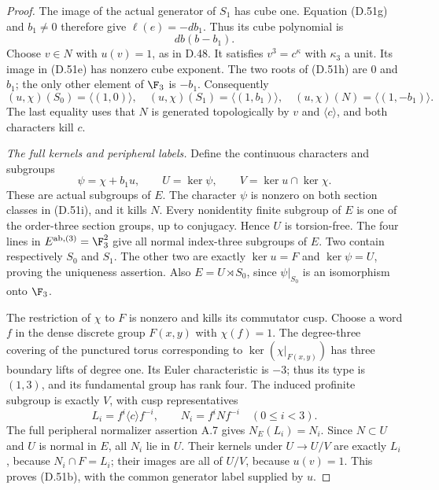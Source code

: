\begin{proof}
The image of the actual generator of $S_1$
has cube one. Equation (D.51g) and $b_1\ne0$
therefore give $\ell(e)=-db_1$.
Thus its cube polynomial is
\[
                           db(b-b_1).
                                                        \tag{D.51h}
\]
Choose $v\in N$ with $u(v)=1$, as in D.48.
It satisfies $v^3=c^\kappa$ with
$\kappa_3$ a unit. Its image in (D.51e)
has nonzero cube exponent. The two roots of
(D.51h) are $0$ and $b_1$; the only other
element of $\F_3$ is $-b_1$. Consequently
\[
             (u,\chi)(S_0)=\langle(1,0)\rangle,\quad
             (u,\chi)(S_1)=\langle(1,b_1)\rangle,\quad
             (u,\chi)(N)=\langle(1,-b_1)\rangle .
                                                        \tag{D.51i}
\]
The last equality uses that $N$ is generated
topologically by $v$ and $\langle c\rangle$,
and both characters kill $c$.

\emph{The full kernels and peripheral labels.}
Define the continuous characters and subgroups
\[
           \psi=\chi+b_1u,\qquad
           U=\ker\psi,\qquad V=\ker u\cap\ker\chi .
                                                        \tag{D.51j}
\]
These are actual subgroups of $E$.
The character $\psi$ is nonzero on both
section classes in (D.51i), and it kills $N$.
Every nonidentity finite subgroup of $E$
is one of the order-three section groups,
up to conjugacy. Hence $U$ is torsion-free.
The four lines in $E^{\rm ab,(3)}=\F_3^2$
give all normal index-three subgroups of $E$.
Two contain respectively $S_0$ and $S_1$.
The other two are exactly $\ker u=F$ and
$\ker\psi=U$, proving the uniqueness assertion.
Also $E=U\rtimes S_0$, since $\psi|_{S_0}$
is an isomorphism onto $\F_3$.

The restriction of $\chi$ to $F$ is nonzero
and kills its commutator cusp.
Choose a word $f$ in the dense discrete
group $F(x,y)$ with $\chi(f)=1$.
The degree-three covering of the punctured
torus corresponding to $\ker(\chi|_{F(x,y)})$
has three boundary lifts of degree one.
Its Euler characteristic is $-3$; thus its
type is $(1,3)$, and its fundamental group
has rank four.
The induced profinite subgroup is exactly $V$,
with cusp representatives
\[
          L_i=f^i\langle c\rangle f^{-i},
          \qquad
          N_i=f^i N f^{-i}\quad(0\leq i<3).
                                                        \tag{D.51k}
\]
The full peripheral normalizer assertion A.7
gives $N_E(L_i)=N_i$.
Since $N\subset U$ and $U$ is normal in $E$,
all $N_i$ lie in $U$. Their kernels under
$U\to U/V$ are exactly $L_i$, because
$N_i\cap F=L_i$; their images are all of
$U/V$, because $u(v)=1$.
This proves (D.51b), with the common generator
label supplied by $u$.


\end{proof}
